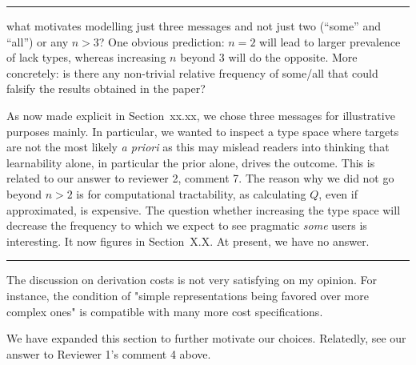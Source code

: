 \documentclass[12pt,a4paper]{article}
\newcommand{\hl}[1]{\textcolor[rgb]{.8,.33,.0}{#1}}%
\begin{document}
%
\noindent\rule{\textwidth}{1pt}

\begin{mdframed}[backgroundcolor=gray!25,linecolor=gray!25,frametitle= Reviewer \thereviewerCounter~comment \thereviewerCommentCounter \hfill ~~({\it message amount})]
%
what motivates modelling just three messages and not just two (``some'' and ``all'') or any $n>3$? One obvious prediction: $n=2$ will lead to larger prevalence of lack types, whereas increasing $n$ beyond $3$ will do the opposite. More concretely: is there any non-trivial relative frequency of some/all that could falsify the results obtained in the paper?

%
\end{mdframed}

As now made explicit in \hl{Section~xx.xx}, we chose three messages for illustrative purposes mainly. In particular, we wanted to inspect a type space where targets are not the most likely {\em a priori} as this may mislead readers into thinking that learnability alone, in particular the prior alone, drives the outcome. This is related to our answer to reviewer 2, comment 7. The reason why we did not go beyond $n>2$ is for computational tractability, as calculating $Q$, even if approximated, is expensive. The question whether increasing the type space will decrease the frequency to which we expect to see pragmatic {\em some} users is interesting. It now figures in \hl{Section~X.X}. At present, we have no answer. 



\noindent\rule{\textwidth}{1pt}

\begin{mdframed}[backgroundcolor=gray!25,linecolor=gray!25,frametitle= Reviewer \thereviewerCounter~comment \thereviewerCommentCounter \hfill ~~({\it LOT \& complexity})]
%
The discussion on derivation costs is not very satisfying on my opinion. For instance, the condition of "simple representations being favored over more complex ones" is compatible with many more cost specifications.

%
\end{mdframed}

We have expanded this section to further motivate our choices. Relatedly, see our answer to Reviewer 1's comment 4 above.

%
%
%
%
%





\end{document}
